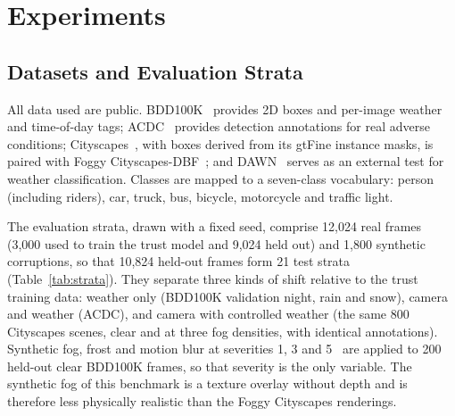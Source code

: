 \documentclass[pdflatex,sn-mathphys-num]{sn-jnl}
\begin{document}
\section{Experiments}\label{sec:exp}

\subsection{Datasets and Evaluation Strata}

All data used are public. BDD100K~\cite{yu2020bdd100k} provides 2D boxes and per-image weather and time-of-day tags; ACDC~\cite{sakaridis2021acdc} provides detection annotations for real adverse conditions; Cityscapes~\cite{cordts2016cityscapes}, with boxes derived from its gtFine instance masks, is paired with Foggy Cityscapes-DBF~\cite{sakaridis2018foggy}; and DAWN~\cite{kenk2020dawn} serves as an external test for weather classification. Classes are mapped to a seven-class vocabulary: person (including riders), car, truck, bus, bicycle, motorcycle and traffic light.

The evaluation strata, drawn with a fixed seed, comprise 12,024 real frames (3,000 used to train the trust model and 9,024 held out) and 1,800 synthetic corruptions, so that 10,824 held-out frames form 21 test strata (Table~\ref{tab:strata}). They separate three kinds of shift relative to the trust training data: weather only (BDD100K validation night, rain and snow), camera and weather (ACDC), and camera with controlled weather (the same 800 Cityscapes scenes, clear and at three fog densities, with identical annotations). Synthetic fog, frost and motion blur at severities 1, 3 and 5~\cite{hendrycks2019benchmarking} are applied to 200 held-out clear BDD100K frames, so that severity is the only variable. The synthetic fog of this benchmark is a texture overlay without depth and is therefore less physically realistic than the Foggy Cityscapes renderings.
\end{document}

